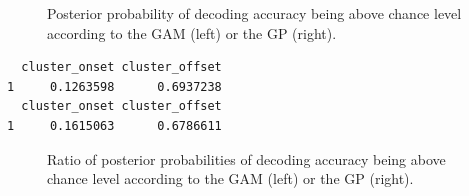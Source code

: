 \documentclass[
  doc,
  floatsintext,
  longtable,
  a4paper,
  nolmodern,
  notxfonts,
  notimes,
  colorlinks=true,linkcolor=blue,citecolor=blue,urlcolor=blue]{apa7}
\begin{document}
\begin{figure}[!htb]

\caption{\label{fig-decoding-post}Posterior probability of decoding
accuracy being above chance level according to the GAM (left) or the GP
(right).}


\end{figure}%

\begin{verbatim}
  cluster_onset cluster_offset
1     0.1263598      0.6937238
  cluster_onset cluster_offset
1     0.1615063      0.6786611
\end{verbatim}

\begin{figure}[!htb]

\caption{\label{fig-decoding-ratio}Ratio of posterior probabilities of
decoding accuracy being above chance level according to the GAM (left)
or the GP (right).}


\end{figure}%
\end{document}
